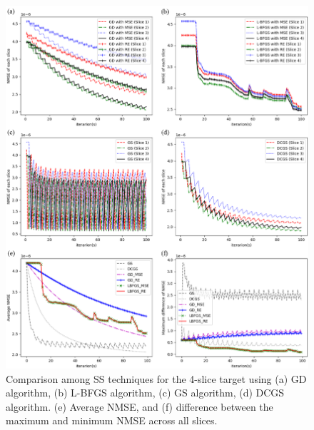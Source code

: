 \begin{figure}[h!]
	\centering
	\includegraphics[width=1.0\textwidth]{Comparison_among_SS_methods_for_the_4_slice_target}
	\caption{Comparison among SS techniques for the 4-slice target using (a) GD algorithm, (b) L-BFGS algorithm, (c) GS algorithm, (d) DCGS algorithm. (e) Average NMSE, and (f) difference between the maximum and minimum NMSE across all slices.}
	\label{fig:SS_NMSE_iteration_compare}
\end{figure}
